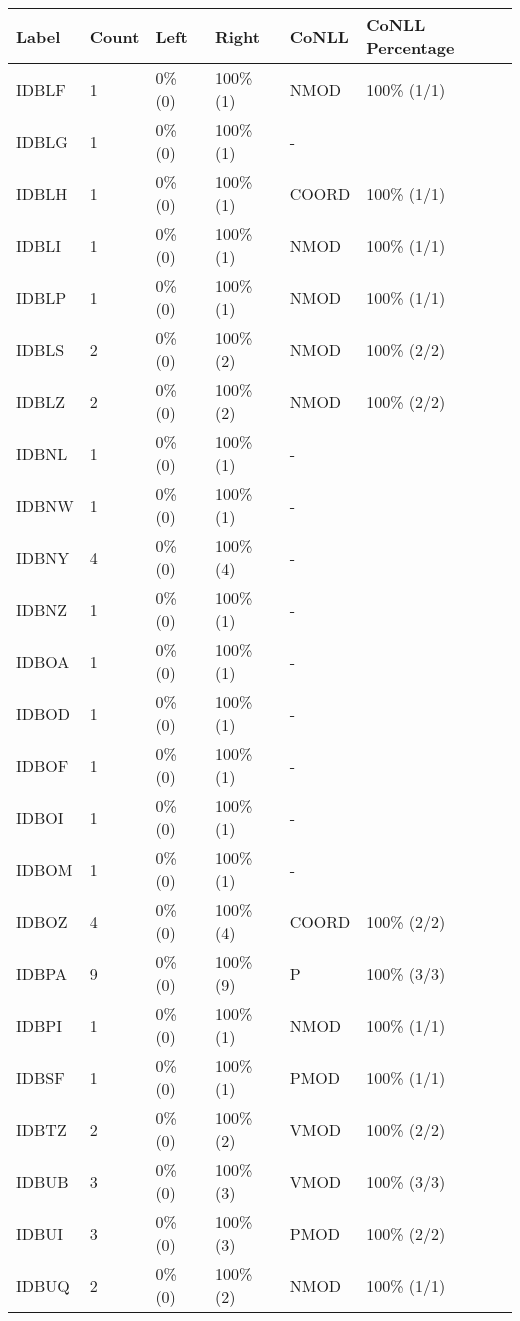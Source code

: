 \begin{figure*}
\begin{tabular}{|l|l|l|l||l|l|}
\hline
Label & Count & Left & Right & CoNLL & CoNLL Percentage\\ 
\hline
 IDBLF & 1 & 0\% (0) & 100\% (1) & NMOD & 100\% (1/1) \\ 
\hline
 IDBLG & 1 & 0\% (0) & 100\% (1) & - &  \\ 
\hline
 IDBLH & 1 & 0\% (0) & 100\% (1) & COORD & 100\% (1/1) \\ 
\hline
 IDBLI & 1 & 0\% (0) & 100\% (1) & NMOD & 100\% (1/1) \\ 
\hline
 IDBLP & 1 & 0\% (0) & 100\% (1) & NMOD & 100\% (1/1) \\ 
\hline
 IDBLS & 2 & 0\% (0) & 100\% (2) & NMOD & 100\% (2/2) \\ 
\hline
 IDBLZ & 2 & 0\% (0) & 100\% (2) & NMOD & 100\% (2/2) \\ 
\hline
 IDBNL & 1 & 0\% (0) & 100\% (1) & - &  \\ 
\hline
 IDBNW & 1 & 0\% (0) & 100\% (1) & - &  \\ 
\hline
 IDBNY & 4 & 0\% (0) & 100\% (4) & - &  \\ 
\hline
 IDBNZ & 1 & 0\% (0) & 100\% (1) & - &  \\ 
\hline
 IDBOA & 1 & 0\% (0) & 100\% (1) & - &  \\ 
\hline
 IDBOD & 1 & 0\% (0) & 100\% (1) & - &  \\ 
\hline
 IDBOF & 1 & 0\% (0) & 100\% (1) & - &  \\ 
\hline
 IDBOI & 1 & 0\% (0) & 100\% (1) & - &  \\ 
\hline
 IDBOM & 1 & 0\% (0) & 100\% (1) & - &  \\ 
\hline
 IDBOZ & 4 & 0\% (0) & 100\% (4) & COORD & 100\% (2/2) \\ 
\hline
 IDBPA & 9 & 0\% (0) & 100\% (9) & P & 100\% (3/3) \\ 
\hline
 IDBPI & 1 & 0\% (0) & 100\% (1) & NMOD & 100\% (1/1) \\ 
\hline
 IDBSF & 1 & 0\% (0) & 100\% (1) & PMOD & 100\% (1/1) \\ 
\hline
 IDBTZ & 2 & 0\% (0) & 100\% (2) & VMOD & 100\% (2/2) \\ 
\hline
 IDBUB & 3 & 0\% (0) & 100\% (3) & VMOD & 100\% (3/3) \\ 
\hline
 IDBUI & 3 & 0\% (0) & 100\% (3) & PMOD & 100\% (2/2) \\ 
\hline
 IDBUQ & 2 & 0\% (0) & 100\% (2) & NMOD & 100\% (1/1) \\ 

\end{tabular}
\end{figure*}
